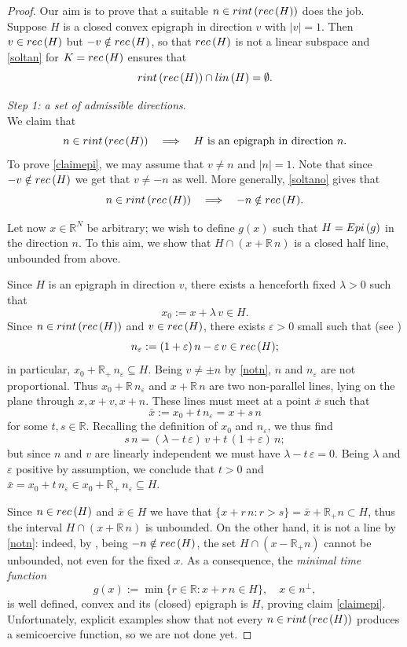 \documentclass[12pt]{amsart}
\numberwithin{equation}{section}
\theoremstyle{plain}
\theoremstyle{plain}
\theoremstyle{plain}
\theoremstyle{definition}
\newcommand{\R}{{\mathbb R}}
\newcommand{\eps}{\varepsilon}
\newcommand{\beq}{\begin{equation}}
\newcommand{\eeq}{\end{equation}}
\begin{document}
\begin{proof}
 Our aim is to prove that a suitable $n\in {\rm rint}\, ({\rm rec}\, (H))$ does the job.
Suppose $H$ is a closed convex epigraph in direction $v$ with $|v|=1$. 
Then $v\in {\rm rec}\, (H)$ but $-v\notin {\rm rec}\, (H)$, so that 
${\rm rec}\, (H)$ is not a linear subspace and \eqref{soltan} for $K={\rm rec}\, (H)$ ensures that 
\beq
\label{soltano}
{\rm rint}\, ({\rm rec}\, (H))\cap {\rm lin}\, (H)=\emptyset.
\eeq 

\smallskip
 {\em Step 1: a set of admissible directions}.\ \\
We claim that
\beq
\label{claimepi}
n\in {\rm rint}\, ({\rm rec}\, (H))\quad \Longrightarrow\quad \text{$H$ is an epigraph in direction $n$}.
\eeq
 To prove \eqref{claimepi}, we may assume that $v\ne n$ and $|n|=1$. Note that since $-v\notin {\rm rec}\, (H)$ we get that $v\neq -n$ as well. 
More generally, \eqref{soltano} gives that
 \beq
\label{notn}
n\in {\rm rint}\, ({\rm rec}\, (H))\quad \Longrightarrow \quad -n\notin {\rm rec}\, (H).
\eeq

 Let now $x\in \R^N$ be arbitrary; we wish to define $g(x)$ such that $H = {\rm Epi}\, (g)$ in the direction $n$. 
To this aim, we show that $H\cap (x+\R\, n)$ is a closed half line, unbounded from above.
 
Since $H$ is an epigraph in direction $v$, there exists a henceforth fixed $\lambda>0$ such that 
\[
x_0:=x+\lambda\, v\in H.
\] 
Since $n\in {\rm rint}\, ({\rm rec}\, (H))$ and $v\in {\rm rec}\, (H)$, there exists $\eps>0$ small such that (see \cite[Theorem 6.4]{Roc96}) 
\[
n_\eps :=(1+\eps)\, n-\eps\, v 
\in {\rm rec}\, (H);
\]
in particular, $x_0+\R_+\, n_\eps\subseteq H$. 
Being $v \neq \pm n$ by \eqref{notn}, $n$ and $n_\eps$ are not proportional. 
Thus $x_0+\R\, n_\eps$ and $x+\R\, n$ are two non-parallel lines, lying on the plane through $x, x+v, x+n$. 
These lines must meet at a point $\bar x$ such that
\[
\bar x:=x_0+t\, n_\eps = x+s\, n
\]
for some $t, s\in \R$. Recalling the definition of $x_0$ and $n_\eps$, we thus find
\[
s\, n = (\lambda-t\, \eps)\, v+t\, (1+\eps)\, n;
\]
but since $n$ and $v$ are linearly independent we must have $\lambda-t\, \eps=0$.
Being $\lambda$ and $\eps$ positive by assumption, we conclude that $t>0$ and $\bar x=x_0+t\, n_\eps\in x_0+\R_+\,n_\eps\subseteq H$.

Since $n\in {\rm rec}\, (H)$ and $\bar{x} \in H$ we have that $\{x +r \, n : r >s\} = \bar{x} + \R_+ n \subset H$, thus the interval $H\cap (x+\R\, n)$ is unbounded. 
On the other hand, it is not a line by \eqref{notn}: indeed, by \cite[Theorem 8.3]{Roc96}, being $-n\notin {\rm rec}\, (H)$, the set $H \cap (x-\R_+n)$ cannot be unbounded, not even for the fixed $x$. 
As a consequence, the \emph{minimal time function}
\beq
\label{defgtime}
g(x):=\min\big\{r\in \R: x+r\, n\in H\big\}, \quad x \in n^{\perp},
\eeq
is well defined, convex and its (closed) epigraph is $H$, proving claim \eqref{claimepi}. 
Unfortunately, explicit examples show that not every $n\in {\rm rint}\, ({\rm rec}\, (H))$ produces a semicoercive function, so we are not done yet.


\end{proof}
\end{document}
